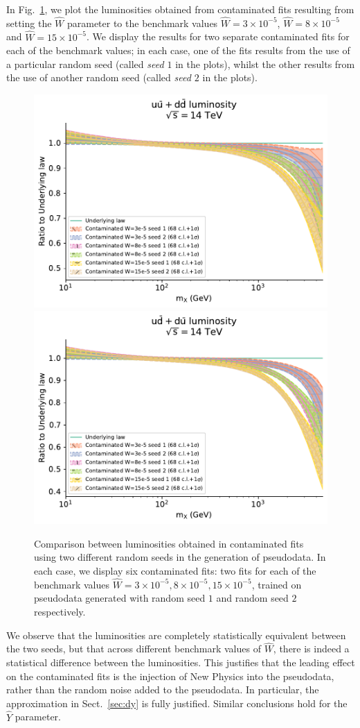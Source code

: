 \documentclass[withindex,glossary]{cam-thesis}
\begin{document}
In Fig.~\ref{fig:lumi_random}, we plot the luminosities obtained
from contaminated fits resulting from setting the $\hat{W}$ parameter to the benchmark values $\hat{W} = 3 \times 10^{-5}$, $\hat{W} = 8 \times 10^{-5}$ and $\hat{W} = 15 \times 10^{-5}$. We display the results for two separate contaminated fits for each of the benchmark values; in each case, one of the fits results from the use of a particular random seed (called \textit{seed $1$} in the plots), whilst the other results from the use of another random seed (called \textit{seed $2$} in the plots). 
 \begin{figure}[h!]
  \includegraphics[width=0.49\linewidth]{Figures/lumi_cont_qqb_2seeds.pdf}
  \includegraphics[width=0.49\linewidth]{Figures/lumi_cont_udb_2seeds.pdf}
  \caption{Comparison between luminosities obtained in contaminated fits using two different random seeds in the generation of pseudodata. In each case, we display six contaminated fits: two fits for each of the benchmark values $\hat{W} = 3 \times 10^{-5}, 8 \times 10^{-5}, 15 \times 10^{-5}$, trained on pseudodata generated with random seed $1$ and random seed $2$ respectively.}
\label{fig:lumi_random}
\end{figure}
We observe that the luminosities are completely statistically equivalent between the two seeds, but that across different benchmark values of $\hat{W}$, there is indeed a statistical difference between the luminosities. This justifies that the leading effect on the contaminated fits is the injection of New Physics into the pseudodata, rather than the random noise added to the pseudodata. In particular, the approximation in Sect.~\ref{sec:dy} is fully justified. Similar conclusions hold for the $\hat{Y}$ parameter.
\end{document}
